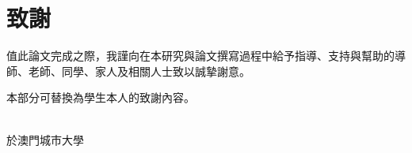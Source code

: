 \chapter*{致謝}
{}

值此論文完成之際，我謹向在本研究與論文撰寫過程中給予指導、支持與幫助的導師、老師、同學、家人及相關人士致以誠摯謝意。

本部分可替換為學生本人的致謝內容。

\vspace{2.0cm}

\begin{flushright}
\studentname \\
於澳門城市大學 \\
\submissiondate
\end{flushright}
